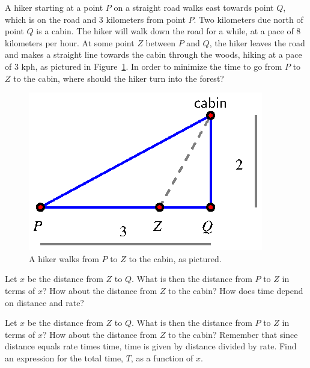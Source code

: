\begin{activity} \label{A:3.4.2}  A hiker starting at a point $P$ on a straight road walks east towards point $Q$, which is on the road and 3 kilometers from point $P$.  Two kilometers due north of point $Q$ is a cabin.  The hiker will walk down the road for a while, at a pace of 8 kilometers per hour.  At some point $Z$ between $P$ and $Q$, the hiker leaves the road and makes a straight line towards the cabin through the woods, hiking at a pace of 3 kph, as pictured in Figure~\ref{F:3.4.Act2}.  In order to minimize the time to go from $P$ to $Z$ to the cabin, where should the hiker turn into the forest?
\begin{figure}[h]
\begin{center}
\includegraphics{figures/3_4_Act2.eps}
\caption{A hiker walks from $P$ to $Z$ to the cabin, as pictured.} \label{F:3.4.Act2}
\end{center}
\end{figure}
\end{activity}
\begin{smallhint}
Let $x$ be the distance from $Z$ to $Q$. What is then the distance from $P$ to $Z$ in terms of $x$?  How about the distance from $Z$ to the cabin?  How does time depend on distance and rate?
\end{smallhint}
\begin{bighint}
Let $x$ be the distance from $Z$ to $Q$. What is then the distance from $P$ to $Z$ in terms of $x$?  How about the distance from $Z$ to the cabin?  Remember that since distance equals rate times time, time is given by distance divided by rate.  Find an expression for the total time, $T$, as a function of $x$.
\end{bighint}
